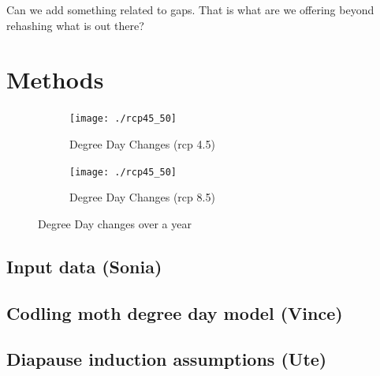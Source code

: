 \documentclass[12pt]{article}
\theoremstyle{plain}
\theoremstyle{definition}
\theoremstyle{definition}
\begin{document}
Can we add something related to gaps. That is what are we offering beyond rehashing what is out there?

\section{Methods}
\begin{figure}[h!]
\begin{subfigure}{.5\textwidth}
  \centering
  \texttt{[image: ./rcp45\_50]}
  \label{fig:DDC45}
\caption{Degree Day Changes (rcp 4.5)}
\end{subfigure}
\begin{subfigure}{.5\textwidth}
  \centering
  \texttt{[image: ./rcp45\_50]}
  \label{fig:DDC85}
\caption{Degree Day Changes (rcp 8.5)}
\end{subfigure}
\caption{Degree Day changes over a year}
\label{fig:DDC}
\end{figure}

\subsection{Input data  (Sonia)}
\subsection{Codling moth degree day model (Vince)}
\subsection{Diapause induction assumptions (Ute)}
\end{document}
